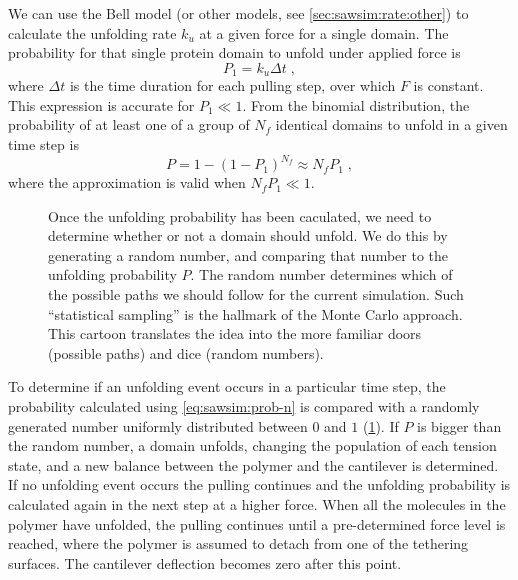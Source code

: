We can use the Bell model (or other models, see
\cref{sec:sawsim:rate:other}) to calculate the unfolding rate $k_u$ at
a given force for a single domain.  The probability for that single
protein domain to unfold under applied force is
\begin{equation}
  P_1 = k_u \Delta t \;,  \label{eq:sawsim:prob-one}
\end{equation}
where $\Delta t$ is the time duration for each pulling step, over
which $F$ is constant.  This expression is accurate for $P_1 \ll 1$.
From the binomial distribution, the probability of at least one of a
group of $N_f$ identical domains to unfold in a given time step is
\begin{equation}
  P = 1 - (1-P_1)^{N_f} \approx N_fP_1 \;,  \label{eq:sawsim:prob-n}
\end{equation}
where the approximation is valid when $N_fP_1 \ll 1$.
%

\begin{figure}
  \caption{Once the unfolding probability has been caculated, we need
    to determine whether or not a domain should unfold.  We do this by
    generating a random number, and comparing that number to the
    unfolding probability $P$.  The random number determines which of
    the possible paths we should follow for the current simulation.
    Such ``statistical sampling'' is the hallmark of the Monte Carlo
    approach\citep{metropolis87}.  This cartoon translates the idea
    into the more familiar doors (possible paths) and dice (random
    numbers).%
    \label{fig:monte-carlo}}
\end{figure}

To determine if an unfolding event occurs in a particular time step,
the probability calculated using \cref{eq:sawsim:prob-n} is compared
with a randomly generated number uniformly distributed between $0$ and
$1$ (\cref{fig:monte-carlo}).  If $P$ is bigger than the random
number, a domain unfolds, changing the population of each tension
state, and a new balance between the polymer and the cantilever is
determined.  If no unfolding event occurs the pulling continues and
the unfolding probability is calculated again in the next step at a
higher force.  When all the molecules in the polymer have unfolded,
the pulling continues until a pre-determined force level is reached,
where the polymer is assumed to detach from one of the tethering
surfaces.  The cantilever deflection becomes zero after this point.

